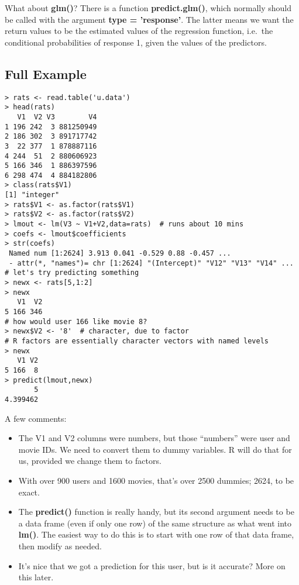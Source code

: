 What about \textbf{glm()}?  There is a function \textbf{predict.glm()},
which normally should be called with the argument \textbf{type =
'response'}.  The latter means we want the return values to be the
estimated values of the regression function, i.e.\ the conditional
probabilities of response 1, given the values of the predictors.

\subsection{Full Example}
\label{lmex}

\begin{lstlisting}
> rats <- read.table('u.data')
> head(rats)
   V1  V2 V3        V4
1 196 242  3 881250949
2 186 302  3 891717742
3  22 377  1 878887116
4 244  51  2 880606923
5 166 346  1 886397596
6 298 474  4 884182806
> class(rats$V1)
[1] "integer"
> rats$V1 <- as.factor(rats$V1)
> rats$V2 <- as.factor(rats$V2)
> lmout <- lm(V3 ~ V1+V2,data=rats)  # runs about 10 mins
> coefs <- lmout$coefficients
> str(coefs)
 Named num [1:2624] 3.913 0.041 -0.529 0.88 -0.457 ...
 - attr(*, "names")= chr [1:2624] "(Intercept)" "V12" "V13" "V14" ...
# let's try predicting something
> newx <- rats[5,1:2]
> newx
   V1  V2
5 166 346
# how would user 166 like movie 8?
> newx$V2 <- '8'  # character, due to factor
# R factors are essentially character vectors with named levels
> newx
   V1 V2
5 166  8
> predict(lmout,newx)
       5 
4.399462 
\end{lstlisting}

A few comments:

\begin{itemize}

\item The V1 and V2 columns were numbers, but those ``numbers'' were
user and movie IDs.  We need to convert them to dummy variables.  R will
do that for us, provided we change them to factors.

\item With over 900 users and 1600 movies, that's over 2500 dummies;
2624, to be exact.

\item The \textbf{predict()} function is really handy, but its second
argument needs to be a data frame (even if only one row) of the same
structure as what went into \textbf{lm()}.  The easiest way to do this
is to start with one row of that data frame, then modify as needed.

\item It's nice that we got a prediction for this user, but is it
accurate?  More on this later.
\end{itemize} 


